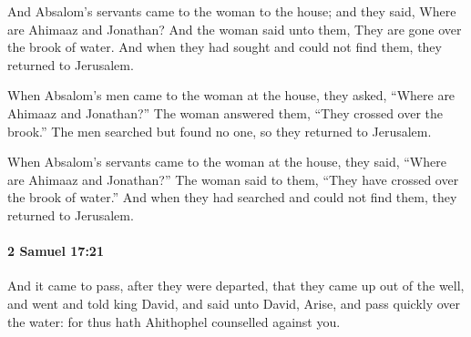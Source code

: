 			\begin{versebox}
					\item[BHS] 
					\item[ASV] And Absalom's servants came to the woman to the house; and they said, Where are Ahimaaz and Jonathan? And the woman said unto them, They are gone over the brook of water. And when they had sought and could not find them, they returned to Jerusalem.
					\item[NIV] When Absalom’s men came to the woman at the house, they asked, “Where are Ahimaaz and Jonathan?” The woman answered them, “They crossed over the brook.” The men searched but found no one, so they returned to Jerusalem.
					\item[NRSV] When Absalom’s servants came to the woman at the house, they said, “Where are Ahimaaz and Jonathan?” The woman said to them, “They have crossed over the brook of water.” And when they had searched and could not find them, they returned to Jerusalem.
			\end{versebox}

		\paragraph{2 Samuel 17:21} %
			\label{2SAMUEL-17-21}

			And it came to pass, after they were departed, that they came up out of the well, and went and told king David, and said unto David, Arise, and pass quickly over the water: for thus hath Ahithophel counselled against you.

